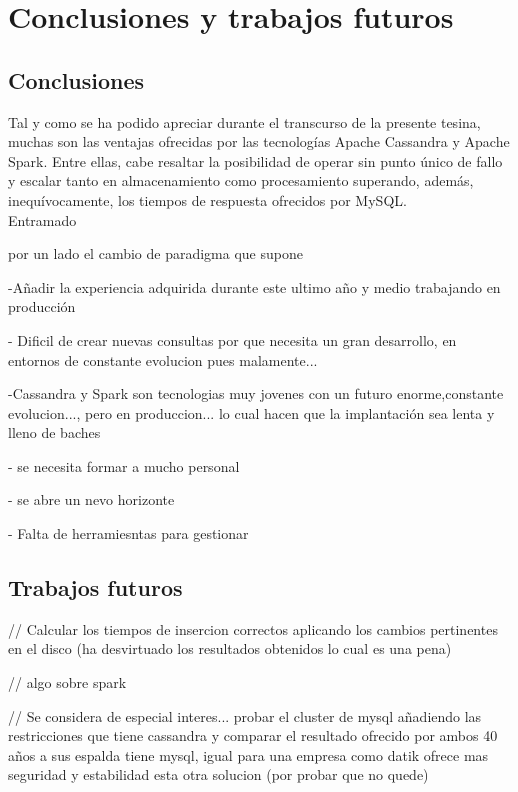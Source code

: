 
\pagestyle{fancy}

\chapter{Conclusiones y trabajos futuros}
\label{conclusiones}



\section{Conclusiones}

Tal y como se ha podido apreciar durante el transcurso de la presente tesina, muchas son las ventajas ofrecidas por las tecnologías Apache Cassandra y Apache Spark. Entre ellas, cabe resaltar la posibilidad de operar sin punto único de fallo y escalar tanto en almacenamiento como procesamiento superando, además, inequívocamente, los tiempos de respuesta ofrecidos por MySQL.\\

Entramado

por un lado el cambio de paradigma que supone

-Añadir la experiencia adquirida durante este ultimo año y medio trabajando en producción

- Dificil de crear nuevas consultas por que necesita un gran desarrollo, en entornos de constante evolucion pues malamente...

-Cassandra y Spark son tecnologias muy jovenes con un futuro enorme,constante evolucion..., pero en produccion... lo cual hacen que la implantación sea lenta y lleno de baches

- se necesita formar a mucho personal

- se abre un nevo horizonte

- Falta de herramiesntas para gestionar

\section{Trabajos futuros}

//
Calcular los tiempos de insercion correctos aplicando los cambios pertinentes en el disco (ha desvirtuado los resultados obtenidos lo cual es una pena)

// algo sobre spark

//
Se considera de especial interes... 
probar el cluster de mysql añadiendo las restricciones que tiene cassandra y comparar el resultado ofrecido por ambos
40 años a sus espalda tiene mysql, 
igual para una empresa como datik ofrece mas seguridad y estabilidad esta otra solucion (por probar que no quede)

